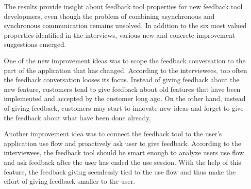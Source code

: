 \documentclass[english,12pt,a4paper,pdftex]{article}
\begin{document}
The results provide insight about feedback tool properties for new feedback tool developmers, even though the problem of combining asynchronous and synchronous communication remains unsolved. In addition to the six most valued properties identified in the interviews, various new and concrete improvement suggestions emerged.

One of the new improvement ideas was to scope the feedback conversation to the part of the application that has changed. According to the interviewees, too often the feedback conversation looses its focus. Instead of giving feedback about the new feature, customers tend to give feedback about old features that have been implemented and accepted by the customer long ago. On the other hand, instead of giving feedback, customers may start to innovate new ideas and forget to give the feedback about what have been done already.

Another improvement idea was to connect the feedback tool to the user's application use flow and proactively ask user to give feedback. According to the interviewees, the feedback tool should be smart enough to analyze users use flow and ask feedback after the user has ended the use session. With the help of this feature, the feedback giving seemlessly tied to the use flow and thus make the effort of giving feedback smaller to the user.

\end{document}

